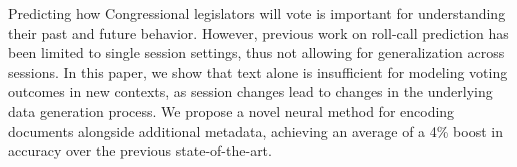 Predicting how Congressional legislators will vote is important for understanding their past and future behavior. However, previous work on roll-call prediction has been limited to single session settings, thus not allowing for generalization across sessions. In this paper, we show that text alone is insufficient for modeling voting outcomes in new contexts, as session changes lead to changes in the underlying data generation process. We propose a novel neural method for encoding documents alongside additional metadata, achieving an average of a 4\% boost in accuracy over the previous state-of-the-art.
